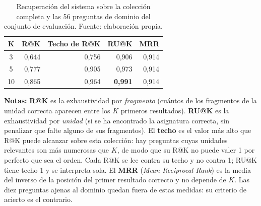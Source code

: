 \begin{table}[htbp]
  \centering
  \small
  \caption[Recuperación sobre el conjunto de evaluación]{Recuperación del
    sistema sobre la colección completa y las 56 preguntas de dominio del
    conjunto de evaluación. Fuente: elaboración propia.}
  \label{tab:recuperacion}
  \begin{tabular}{@{}crrrr@{}}
    \toprule
    \textbf{K} & \textbf{R@K} & \textbf{Techo de R@K} & \textbf{RU@K}  & \textbf{MRR}            \\
    \midrule
    3          & 0,644
               & 0,756
               & 0,906          & 0,914  \\
    5          & 0,777
               & 0,905
               & 0,973          & 0,914  \\
    10         & 0,865
               & 0,964
               & \textbf{0,991} & 0,914  \\
    \bottomrule
  \end{tabular}
  \begin{minipage}{0.95\textwidth}
    \vspace{4pt}
    \tiny
    \textbf{Notas:} \textbf{R@K} es la exhaustividad por \emph{fragmento}
    (cuántos de los fragmentos de la unidad correcta aparecen entre los $K$
    primeros resultados). \textbf{RU@K} es la exhaustividad por \emph{unidad}
    (si se ha encontrado la asignatura correcta, sin penalizar que falte alguno
    de sus fragmentos). El \textbf{techo} es el valor más alto que R@K puede
    alcanzar sobre esta colección: hay preguntas cuyas unidades relevantes son
    más numerosas que $K$, de modo que su R@K no puede valer 1 por perfecto que
    sea el orden. Cada R@K se lee contra su techo y no contra 1; RU@K tiene
    techo 1 y se interpreta sola. El \textbf{MRR} (\textit{Mean Reciprocal
    Rank}) es la media del inverso de la posición del primer resultado correcto
    y no depende de $K$. Las diez preguntas ajenas al dominio
    quedan fuera de estas medidas: su criterio de acierto es el contrario.
  \end{minipage}
\end{table}

